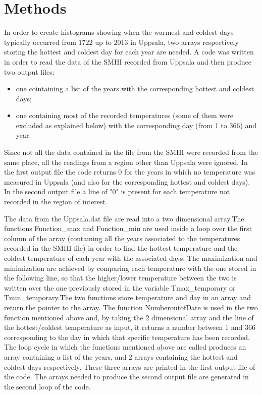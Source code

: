 \usepackage{epstopdf}



\section{Methods}\label{sec:Methods}
In order to create histograms showing when the warmest and coldest days typically occurred from $1722$ up to $2013$ in Uppsala, two
arrays respectively storing the hottest and coldest day for each year are needed. A code was written in order to read the data of
the SMHI recorded from Uppsala and then produce two output files:
\begin{itemize}
\item one cointaining a list of the years with the corresponding hottest and coldest days; 
\item one containing most of the recorded temperatures (some of them were excluded as explained below) with the corresponding day 
(from 1 to 366) and year.
\end{itemize}

Since not all the data contained in the file from the SMHI were recorded from the same place, all the readings from a region other
than Uppsala were ignored. In the first output file the code returns $0$  for the years in which no temperature was measured in
Uppsala (and also for the corresponding hottest and coldest days). In the second output file a line of "$0$" is present for each 
temperature not recorded in the region of interest.

The data from the Uppsala.dat file are read into a two dimensional array.The functions Function{\_}max and Function{\_}min are used
inside a loop over the first column of the array (containing all the years associated to the temperatures recorded in the 
SMHI file) in order to find the hottest temperature and the coldest temperature of each year with the associated days. The maximization
and minimization are achieved by comparing each temperature with the one stored in the following line, so that the higher/lower temperature between 
the two is written over the one previously stored in the variable Tmax{\_}temporary or Tmin{\_}temporary.The two functions store temperature and day in an array and return the pointer to the array. The function NumberoutofDate
is used in the two function mentioned above and, by taking the 2 dimensional array and the line of the hottest/coldest temperature
as input, it returns a number between 1 and 366 corresponding to the day in which that specific temperature has been recorded. 
The loop cycle in which the functions mentioned above are called produces an array containing a list of the years, and 2 arrays 
containing the hottest and coldest days respectively. These three arrays are printed in the first output file of the code.
The arrays needed to produce the second output file are generated in the second loop of the code.

